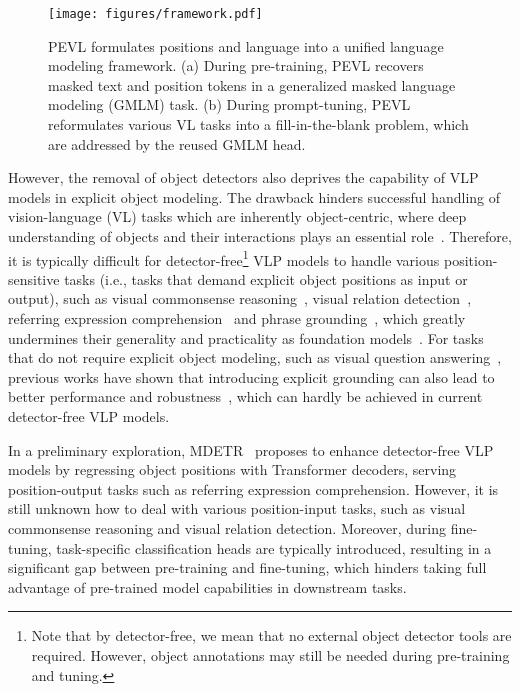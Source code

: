 \documentclass[11pt]{article}
\begin{document}
\begin{figure*}[t]
    \centering
    \texttt{[image: figures/framework.pdf]}
    \caption{PEVL formulates positions and language into a unified language modeling framework. (a) During pre-training, PEVL recovers masked text and position tokens in a generalized masked language modeling (GMLM) task. (b) During prompt-tuning, PEVL reformulates various VL tasks into a fill-in-the-blank problem, which are addressed by the reused GMLM head. }
    \label{fig:framework}
\end{figure*}


However, the removal of object detectors also deprives the capability of VLP models in explicit object modeling. The drawback hinders successful handling of vision-language (VL) tasks which are inherently object-centric, where deep understanding of objects and their interactions plays an essential role~\cite{antol2015vqa,plummer2015flickr30k,krishna2017visual,hudson2019gqa}. Therefore, it is typically difficult for detector-free\footnote{Note that by detector-free, we mean that no external object detector tools are required. However, object annotations may still be needed during pre-training and tuning.} VLP models to handle various position-sensitive tasks (i.e., tasks that demand explicit object positions as input or output), such as visual commonsense reasoning~\cite{zellers2019recognition}, visual relation detection~\cite{krishna2017visual}, referring expression comprehension~\cite{yu2016modeling} and phrase grounding~\cite{plummer2015flickr30k}, which greatly undermines their generality and practicality as foundation models~\cite{bommasani2021opportunities}. For tasks that do not require explicit object modeling, such as visual question answering~\cite{antol2015vqa}, previous works have shown that introducing explicit grounding can also lead to better performance and robustness~\cite{anderson2018bottom,huang2019multi}, which can hardly be achieved in current detector-free VLP models.

In a preliminary exploration, MDETR~\cite{kamath2021mdetr} proposes to enhance detector-free VLP models by regressing object positions with Transformer decoders, serving position-output tasks such as referring expression comprehension. However, it is still unknown how to deal with various position-input tasks, such as visual commonsense reasoning and visual relation detection. Moreover, during fine-tuning, task-specific classification heads are typically introduced, resulting in a significant gap between pre-training and fine-tuning, which hinders taking full advantage of pre-trained model capabilities in downstream tasks.
 
\end{document}
